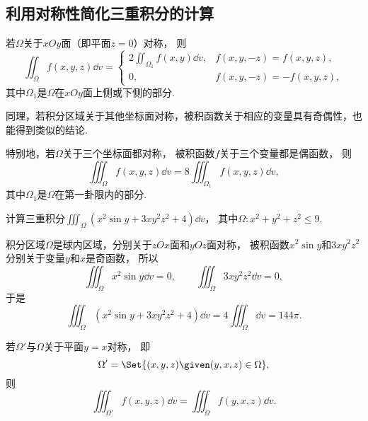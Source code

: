 \subsection{利用对称性简化三重积分的计算}
若\(\Omega\)关于\(xOy\)面（即平面\(z=0\)）对称，
则\begin{equation*}
	\iint_\Omega f(x,y,z) \dd{v}
	= \left\{ \begin{array}{cc}
		2 \iint_{\Omega_1} f(x,y) \dd{v}, & f(x,y,-z) = f(x,y,z), \\
		0, & f(x,y,-z) = -f(x,y,z),
	\end{array} \right.
\end{equation*}
其中\(\Omega_1\)是\(\Omega\)在\(xOy\)面上侧或下侧的部分.

同理，若积分区域关于其他坐标面对称，被积函数关于相应的变量具有奇偶性，也能得到类似的结论.

特别地，若\(\Omega\)关于三个坐标面都对称，
被积函数\(f\)关于三个变量都是偶函数，
则\begin{equation*}
	\iiint_\Omega f(x,y,z) \dd{v}
	= 8 \iiint_{\Omega_1} f(x,y,z) \dd{v},
\end{equation*}
其中\(\Omega_1\)是\(\Omega\)在第一卦限内的部分.

\begin{example}
计算三重积分\(\iiint_\Omega (x^2 \sin y + 3xy^2z^2 + 4) \dd{v}\)，
其中\(\Omega: x^2+y^2+z^2\leq9\).
\begin{solution}
积分区域\(\Omega\)是球内区域，分别关于\(zOx\)面和\(yOz\)面对称，
被积函数\(x^2 \sin y\)和\(3xy^2z^2\)分别关于变量\(y\)和\(x\)是奇函数，
所以\begin{equation*}
	\iiint_\Omega x^2 \sin y \dd{v} = 0,
	\qquad
	\iiint_\Omega 3xy^2z^2 \dd{v} = 0,
\end{equation*}
于是\begin{equation*}
	\iiint_\Omega (x^2 \sin y + 3xy^2z^2 + 4) \dd{v}
	= 4 \iiint_\Omega \dd{v}
	= 144 \pi.
\end{equation*}
\end{solution}
\end{example}

若\(\Omega'\)与\(\Omega\)关于平面\(y=x\)对称，
即\begin{equation*}
	\Omega' = \Set{ (x,y,z) \given (y,x,z) \in \Omega },
\end{equation*}
则\begin{equation*}
	\iiint_{\Omega'} f(x,y,z) \dd{v}
	= \iiint_\Omega f(y,x,z) \dd{v}.
\end{equation*}

